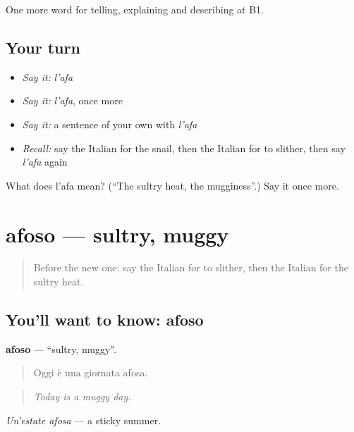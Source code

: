 \begin{grammarlens}[title={What you've built}]
One more word for telling, explaining and describing at B1.
\end{grammarlens}

\subsection*{Your turn}
\begin{itemize}
\raggedright
  \item \emph{Say it:} \emph{l'afa}
  \item \emph{Say it:} \emph{l'afa}, once more
  \item \emph{Say it:} a sentence of your own with \emph{l'afa}
  \item \emph{Recall:} say the Italian for the snail, then the Italian for to slither, then say \emph{l'afa} again
\end{itemize}

\begin{tcolorbox}[breakable,colback=teal!4,colframe=teal!35!black,title={Before you move on}]
What does l'afa mean? (\textquotedblleft{}The sultry heat, the mugginess\textquotedblright{}.) Say it once more.
\end{tcolorbox}
\section[afoso]{afoso — sultry, muggy}

\label{lesson:IT-C466-afoso}



\begin{quote}
Before the new one: say the Italian for to slither, then the Italian for the sultry heat.
\end{quote}

\subsection*{You'll want to know: afoso}
\textbf{afoso} — \textquotedblleft{}sultry, muggy\textquotedblright{}.

\begin{quote}
Oggi è una giornata afosa.
\end{quote}

\begin{quote}
\emph{Today is a muggy day.}
\end{quote}

\emph{Un'estate afosa} — a sticky summer.

